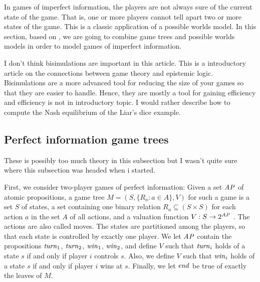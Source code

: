 In games of imperfect information, the players are not always sure of the current state of the game. That is, one or more players cannot tell apart two or more states of the game. This is a classic application of a possible worlds model. In this section, based on \cite{benthem2001a}, we are going to combine game trees and possible worlds models in order to model games of imperfect information.

{ \color{red} I don't think bisimulations are important in this article. This is a introductory article on the connections between game theory and epistemic logic. Bisimulations are a more advanced tool for reducing the size of your games so that they are easier to handle. Hence, they are mostly a tool for gaining efficiency and efficiency is not in introductory topic. I would rather describe how to compute the Nash equilibrium of the Liar's dice example. }

\subsection{Perfect information game trees} \label{seq:perfect-information}

{ \color{red} These is possibly too much theory in this subsection but I wasn't quite sure where this subsection was headed when i started. }

First, we consider two-player games of perfect information: Given a set $ \mathit{AP} $ of atomic propositions, a game tree $ M = (S, \{ R_{a} : a \in A \}, V) $ for such a game is a set $ S $ of states, a set containing one binary relation $ R_{a} \subseteq (S \times S) $ for each action $ a $ in the set $ A $ of all actions, and a valuation function $ V : S \rightarrow 2^{\mathit{AP}} $ \cite{benthem2001a}. The actions are also called moves. The states are partitioned among the players, so that each state is controlled by exactly one player. We let $ \mathit{AP} $ contain the propositions $ \mathit{turn}_{1} $, $ \mathit{turn}_{2} $, $ \mathit{win}_{1} $, $ \mathit{win}_{2} $, and define $ V $ such that $ \mathit{turn}_{i} $ holds of a state $ s $ if and only if player $ i $ controls $ s $. Also, we define $ V $ such that $ \mathit{win}_{i} $ holds of a state $ s $ if and only if player $ i $ wins at $ s $. Finally, we let $ \mathit{end} $ be true of exactly the leaves of $ M $.


